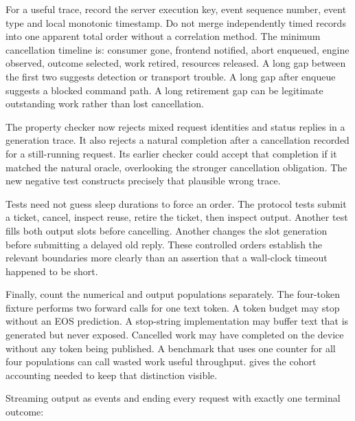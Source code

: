 For a useful trace, record the server execution key, event sequence number,
event type and local monotonic timestamp. Do not merge independently timed
records into one apparent total order without a correlation method.
The minimum cancellation timeline is: consumer gone, frontend notified,
abort enqueued, engine observed, outcome selected, work retired, resources
released. A long gap between the first two suggests detection or transport
trouble. A long gap after enqueue suggests a blocked command path. A long
retirement gap can be legitimate outstanding work rather than lost cancellation.

The property checker now rejects mixed request identities and status replies
in a generation trace. It also rejects a natural completion after a
cancellation recorded for a still-running request. Its earlier checker could
accept that completion if it matched the natural oracle, overlooking the
stronger cancellation obligation. The new negative test constructs precisely
that plausible wrong trace.

Tests need not guess sleep durations to force an order. The protocol tests
submit a ticket, cancel, inspect reuse, retire the ticket, then inspect output.
Another test fills both output slots before cancelling. Another changes the
slot generation before submitting a delayed old reply. These controlled
orders establish the relevant boundaries more clearly than an assertion
that a wall-clock timeout happened to be short.

Finally, count the numerical and output populations separately. The
four-token fixture performs two forward calls for one text token. A token
budget may stop without an EOS prediction. A stop-string implementation may
buffer text that is generated but never exposed. Cancelled work may have
completed on the device without any token being published. A benchmark that
uses one counter for all four populations can call wasted work useful
throughput.  gives the cohort accounting needed to
keep that distinction visible.

\LedgerSection

Streaming output as events and ending every request with exactly one terminal
outcome:


